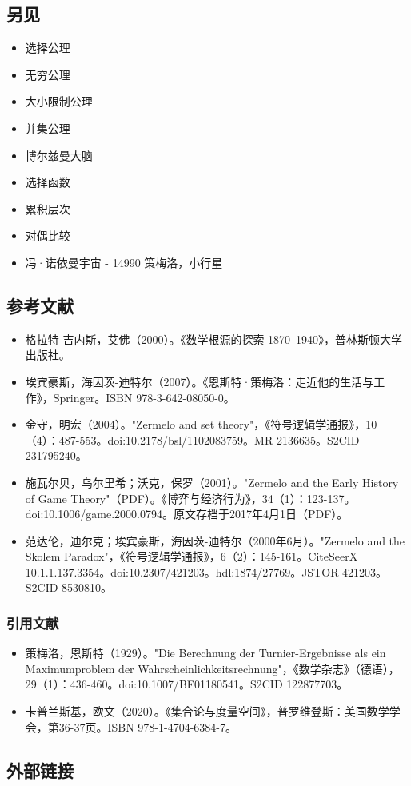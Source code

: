 \subsection{另见}
\begin{itemize}
\item 选择公理
\item 无穷公理
\item 大小限制公理
\item 并集公理
\item 博尔兹曼大脑
\item 选择函数
\item 累积层次
\item 对偶比较
\item 冯·诺依曼宇宙
- 14990 策梅洛，小行星
\end{itemize}
\subsection{参考文献}
\begin{itemize}
\item 格拉特-吉内斯，艾佛（2000）。《数学根源的探索 1870–1940》，普林斯顿大学出版社。
\item 埃宾豪斯，海因茨-迪特尔（2007）。《恩斯特·策梅洛：走近他的生活与工作》，Springer。ISBN 978-3-642-08050-0。
\item 金守，明宏（2004）。"Zermelo and set theory"，《符号逻辑学通报》，10（4）：487-553。doi:10.2178/bsl/1102083759。MR 2136635。S2CID 231795240。
\item 施瓦尔贝，乌尔里希；沃克，保罗（2001）。"Zermelo and the Early History of Game Theory"（PDF）。《博弈与经济行为》，34（1）：123-137。doi:10.1006/game.2000.0794。原文存档于2017年4月1日（PDF）。
\item 范达伦，迪尔克；埃宾豪斯，海因茨-迪特尔（2000年6月）。"Zermelo and the Skolem Paradox"，《符号逻辑学通报》，6（2）：145-161。CiteSeerX 10.1.1.137.3354。doi:10.2307/421203。hdl:1874/27769。JSTOR 421203。S2CID 8530810。
\end{itemize}
\subsubsection{引用文献}
\begin{itemize}
\item 策梅洛，恩斯特（1929）。"Die Berechnung der Turnier-Ergebnisse als ein Maximumproblem der Wahrscheinlichkeitsrechnung"，《数学杂志》（德语），29（1）：436-460。doi:10.1007/BF01180541。S2CID 122877703。
\item 卡普兰斯基，欧文（2020）。《集合论与度量空间》，普罗维登斯：美国数学学会，第36-37页。ISBN 978-1-4704-6384-7。
\end{itemize}
\subsection{外部链接}
